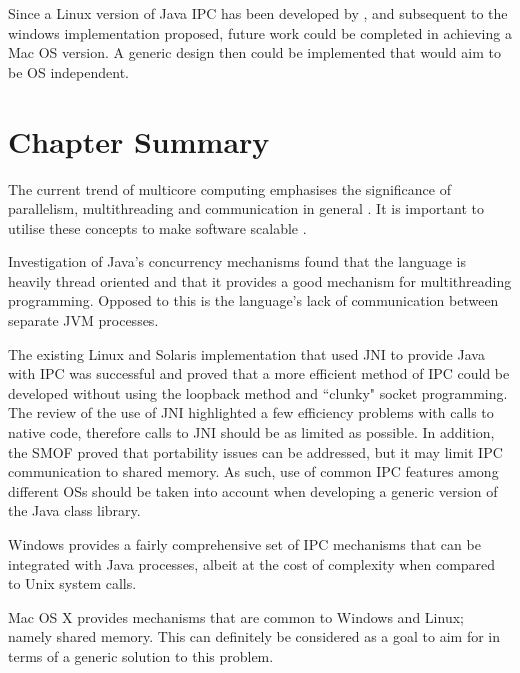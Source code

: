 \documentclass[12pt] {newrucsthesis}    %
\begin{document}
          Since a Linux version of Java IPC has been developed by \cite{WellsIPCJava}, and subsequent to the
          windows implementation proposed, future work could be completed in achieving a Mac OS version.
          A generic design then could be implemented that would aim to be OS independent.

      \section{Chapter Summary}

        The current trend of multicore computing emphasises the significance of parallelism, multithreading and
        communication in general \citep{taboada2013javaforHPC}. It is important to utilise these concepts to make
        software scalable \citep{SlinnJVMAkka}.

        Investigation of Java's concurrency mechanisms found that the language is heavily thread
        oriented and that it provides a good mechanism for multithreading programming. Opposed to this is the
        language's lack of communication between separate JVM processes.

        The existing Linux and Solaris implementation that used JNI to provide Java with IPC was successful and
        proved that a more efficient method of IPC could be developed without using the loopback method and ``clunky"
        socket programming. The review of the use of JNI highlighted a few efficiency problems with calls to native code,
        therefore calls to JNI should be as limited as possible. In addition, the SMOF proved that portability issues can be
        addressed, but it may limit IPC communication to shared memory. As such, use of common IPC features among different OSs
        should be taken into account when developing a generic version of the Java class library.

        Windows provides a fairly comprehensive set of IPC mechanisms that can be integrated with Java processes,
        albeit at the cost of complexity when compared to Unix system calls.

        Mac OS X provides mechanisms that are common to Windows and Linux; namely shared memory.
        This can definitely be considered as a goal to aim for in terms of a generic solution to this problem.

\end{document}
